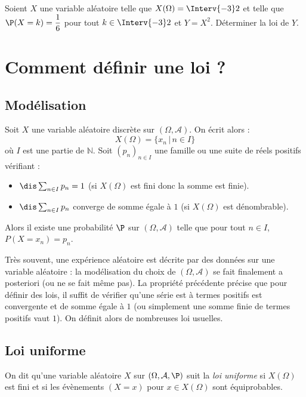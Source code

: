 \documentclass[a4paper,10pt]{report}
\begin{document}
\newpage

\phantom{test}

\vspace{4cm}

\begin{exa} Soient $X$ une variable aléatoire telle que $X(\Omega) = \Interv {-3}2$ et telle que $\P(X=k) = \dfrac 16$ pour tout $k \in \Interv {-3}2$ et $Y = X^2$. Déterminer la loi de $Y$.
 \end{exa}

\section{Comment définir une loi ?}
\subsection{Modélisation}
\begin{prop}[Admise]
Soit $X$ une variable aléatoire discrète sur $(\Omega, \mathcal{A})$. On écrit alors :
$$ X(\Omega)= \lbrace x_n \, \vert \, n \in I \rbrace$$
où $I$ est une partie de $\mathbb{N}$. Soit $(p_n)_{n \in I}$ une famille ou une suite de réels positifs vérifiant :
\begin{itemize}
\item $\dis \sum_{n \in I} p_n = 1$ (si $X(\Omega)$ est fini donc la somme est finie).
\item $\dis \sum_{n \in I} p_n$ converge de somme égale à $1$ (si $X(\Omega)$ est dénombrable).
\end{itemize}
Alors il existe une probabilité $\P$ sur $(\Omega, \mathcal{A})$ telle que pour tout $n \in I$, $P(X=x_n)=p_n$.
\end{prop}

\noindent Très souvent, une expérience aléatoire est décrite par des données sur une variable aléatoire : la modélisation du choix de $(\Omega, \mathcal{A})$ se fait finalement a posteriori (ou ne se fait même pas).  La propriété précédente précise que pour définir des lois, il suffit de vérifier qu'une série est à termes positifs est convergente et de somme égale à $1$ (ou simplement une somme finie de termes positifs vaut $1$). On définit alors de nombreuses loi usuelles.

\subsection{Loi uniforme}

\begin{defin} On dit qu'une variable aléatoire $X$ sur $(\Omega, \mathcal{A}, \P)$ suit la \textit{loi uniforme} si $X(\Omega)$ est fini et si les évènements $(X=x)$ pour $x \in X(\Omega)$ sont équiprobables.
\end{defin}
\end{document}
